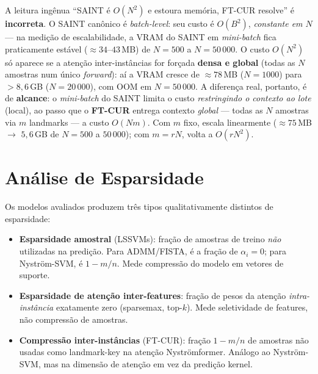 \documentclass[12pt,a4paper]{article}
\begin{document}
\begin{tcolorbox}[colback=warnbg, colframe=warnborder, fonttitle=\bfseries,
  title=\textbf{A comparação real: alcance a custo controlado (não ``denso vs.\ barato'')}]
A leitura ingênua ``SAINT é $O(N^2)$ e estoura memória, FT-CUR resolve'' é
\textbf{incorreta}. O SAINT canônico é \textit{batch-level}: seu custo é
$O(B^2)$, \emph{constante em $N$} --- na medição de escalabilidade, a VRAM do
SAINT em \textit{mini-batch} fica praticamente estável ($\approx 34$--$43$\,MB)
de $N=500$ a $N=50\,000$. O custo $O(N^2)$ só aparece se a atenção
inter-instâncias for forçada \textbf{densa e global} (todas as $N$ amostras num
único \textit{forward}): aí a VRAM cresce de $\approx 78$\,MB ($N=1000$) para
$>8{,}6$\,GB ($N=20\,000$), com OOM em $N=50\,000$. A diferença real, portanto,
é de \textbf{alcance}: o \textit{mini-batch} do SAINT limita o custo
\emph{restringindo o contexto ao lote} (local), ao passo que o \textbf{FT-CUR}
entrega contexto \emph{global} --- todas as $N$ amostras via $m$ landmarks ---
a custo $O(N m)$. Com $m$ fixo, escala linearmente ($\approx 75$\,MB $\to$
$5{,}6$\,GB de $N=500$ a $50\,000$); com $m = rN$, volta a $O(rN^2)$.
\end{tcolorbox}

\section{Análise de Esparsidade}
\label{sec:sparsity}

Os modelos avaliados produzem três tipos qualitativamente distintos de esparsidade:

\begin{itemize}
  \item \textbf{Esparsidade amostral} (LSSVMs): fração de amostras de treino
        \emph{não} utilizadas na predição. Para ADMM/FISTA, é a fração de
        $\alpha_i = 0$; para Nyström-SVM, é $1 - m/n$. Mede compressão do
        modelo em vetores de suporte.
  \item \textbf{Esparsidade de atenção inter-features}: fração de pesos da
        atenção \emph{intra-instância} exatamente zero (sparsemax, top-$k$).
        Mede seletividade de features, não compressão de amostras.
  \item \textbf{Compressão inter-instâncias} (FT-CUR): fração $1 - m/n$ de
        amostras não usadas como landmark-key na atenção Nyströmformer. Análogo
        ao Nyström-SVM, mas na dimensão de atenção em vez da predição kernel.
\end{itemize}
\end{document}
